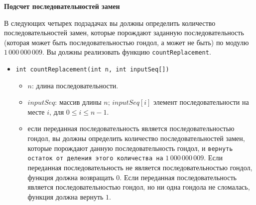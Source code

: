 \textbf{Подсчет последовательностей замен}

В следующих четырех подзадачах вы должны определить количество последовательностей
замен, которые порождают заданную последовательность (которая может быть
последовательностью гондол, а может не быть) по модулю $1\,000\,000\,009$. Вы должны
реализовать функцию \texttt{countReplacement}.

\begin{itemize}
\item \texttt{int countReplacement(int n, int inputSeq[])}
\begin{itemize}
\item $n$: длина последовательности.
\item $inputSeq$: массив длины $n$; $inputSeq[i]$ элемент последовательности на месте $i$, для $0 \le i \le n - 1$.
\item если переданная последовательность является последовательностью гондол, вы должны определить количество последовательностей замен, которые порождают данную последовательность гондол, и \texttt{вернуть остаток от деления этого количества на} $1\,000\,000\,009$. Если переданная последовательность не является последовательностью гондол, функция должна возвращать $0$. Если переданная последовательность является последовательностью гондол, но ни одна гондола не сломалась, функция должна вернуть $1$.
\end{itemize}
\end{itemize}